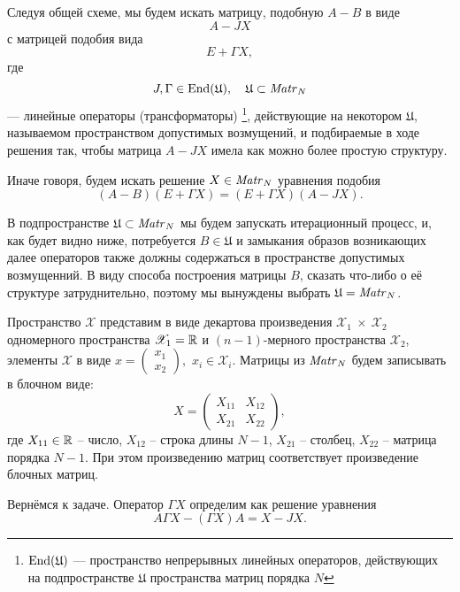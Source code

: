 Следуя общей схеме, мы будем искать матрицу, подобную \( A - B \)
в виде
\[ A - J X \]
с матрицей подобия вида
\[ E + \Gamma X ,\]
где
\[ J, \Gamma \in \mathrm{End}({\mathfrak U}),\quad \mathfrak{U}\subset\mathit{Matr}_{N} {} \]
--- линейные операторы (трансформаторы)
\footnote{\( \mathrm{End}({\mathfrak U}) \) --- пространство непрерывных линейных операторов,
действующих на подпространстве \( \mathfrak U \) пространства матриц порядка \( N \)},
действующие на некотором \( \mathfrak U \),
называемом пространством допустимых возмущений,
и подбираемые в ходе решения так, чтобы матрица \( A - JX \)
имела как можно более простую структуру.

Иначе говоря, будем искать решение \( X \in\mathit{Matr}_{N} {} \)
уравнения подобия
\begin{equation}\label{eq:similarity-orig}
    (A - B)(E+\Gamma X) = (E+\Gamma X) (A - JX).
\end{equation}

В подпространстве \( \mathfrak U \subset \mathit{Matr}_{N} {} \)
мы будем запускать итерационный процесс,
и, как будет видно ниже, потребуется \( B \in \mathfrak U \)
и замыкания образов возникающих далее операторов также
должны содержаться в
пространстве допустимых возмущенний.
В виду способа построения матрицы \( B \), сказать что-либо о её структуре затруднительно,
поэтому мы вынуждены выбрать \( \mathfrak U = \mathit{Matr}_{N} {}\).

Пространство \( \mathscr{X} \) представим в виде
декартова произведения
\( \mathscr{X}_1~\times~\mathscr{X}_2 \)
одномерного пространства \( \mathscr{X}_1=\mathbb{R} \)
и \((n-1)\)-мерного пространства \( \mathscr{X}_2 \),
элементы \( \mathscr{X} \) в виде
\( x=\begin{pmatrix}x_1\\x_2\end{pmatrix}, \)
\( x_i\in\mathscr{X}_i \).
Матрицы из \( \mathit{Matr}_{N} {} \) будем записывать
в блочном виде:
\[
    X = \begin{pmatrix}
    X_{11} & X_{12} \\
    X_{21} & X_{22}
    \end{pmatrix},
    \]
где \( { X_{11}\in\mathbb{R} } \) -- число,
    \( X_{12} \) -- строка длины \( N-1 \),
    \( X_{21} \) -- столбец,
    \( X_{22} \) -- матрица порядка \( N-1 \).
При этом произведению матриц соответствует произведение блочных матриц.

Вернёмся к задаче.
Оператор \( \Gamma X \) определим как решение уравнения\footnotemark
\[
    A\Gamma X - (\Gamma X) A = X - JX.
    \]

